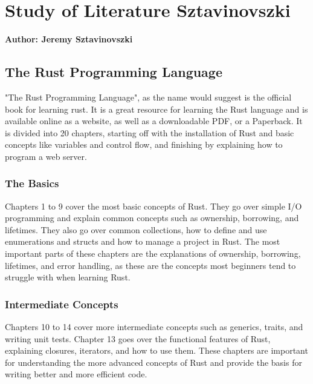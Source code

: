 \chapter{Study of Literature Sztavinovszki}
\textbf{Author: Jeremy Sztavinovszki} 

\section{The Rust Programming Language}
"The Rust Programming Language", as the name would suggest is the official book for learning rust. It is a great resource for learning the Rust language
and is available online as a website, as well as a downloadable PDF, or a Paperback. It is divided into 20 chapters, starting off with the installation
of Rust and basic concepts like variables and control flow, and finishing by explaining how to program a web server.

\subsection{The Basics}
Chapters 1 to 9 cover the most basic concepts of Rust. They go over simple I/O programming and explain common concepts such as ownership, borrowing, and lifetimes.
They also go over common collections, how to define and use enumerations and structs and how to manage a project in Rust. The most important parts of these chapters
are the explanations of ownership, borrowing, lifetimes, and error handling, as these are the concepts most beginners tend to struggle with when learning Rust.

\subsection{Intermediate Concepts}
Chapters 10 to 14 cover more intermediate concepts such as generics, traits, and writing unit tests. Chapter 13 goes over the functional features of Rust, explaining
closures, iterators, and how to use them. These chapters are important for understanding the more advanced concepts of Rust and provide the basis for writing better
and more efficient code.

